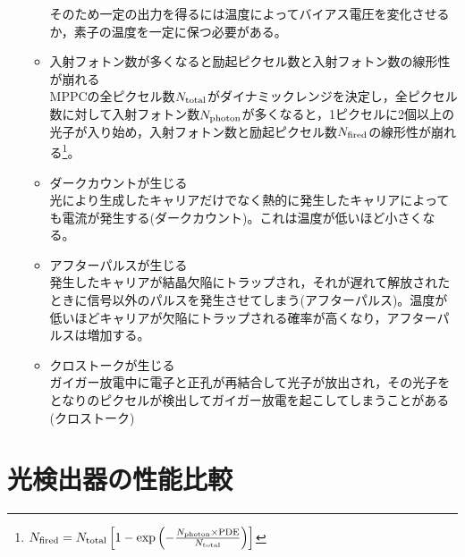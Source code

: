 \begin{itemize}
\begin{itemize}
そのため一定の出力を得るには温度によってバイアス電圧を変化させるか，素子の温度を一定に保つ必要がある。
\item 入射フォトン数が多くなると励起ピクセル数と入射フォトン数の線形性が崩れる\\MPPCの全ピクセル数$ N_{\rm total}$がダイナミックレンジを決定し，全ピクセル数に対して入射フォトン数$ N_{\rm photon}$が多くなると，1ピクセルに2個以上の光子が入り始め，入射フォトン数と励起ピクセル数$ N_{\rm fired}$の線形性が崩れる\footnote{$ N_{\rm fired}= N_{\rm total}\left[1-\exp{\left(-\frac{ N_{\rm photon}\times \rm PDE}{ N_{\rm total}}\right)}\right]$}。
\item ダークカウントが生じる\\光により生成したキャリアだけでなく熱的に発生したキャリアによっても電流が発生する(ダークカウント)。これは温度が低いほど小さくなる。
\item アフターパルスが生じる\\ 発生したキャリアが結晶欠陥にトラップされ，それが遅れて解放されたときに信号以外のパルスを発生させてしまう(アフターパルス)。温度が低いほどキャリアが欠陥にトラップされる確率が高くなり，アフターパルスは増加する。
\item クロストークが生じる\\
ガイガー放電中に電子と正孔が再結合して光子が放出され，その光子をとなりのピクセルが検出してガイガー放電を起こしてしまうことがある(クロストーク)

\end{itemize}

\end{itemize}

\section{光検出器の性能比較}

